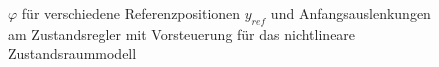 \begin{figure}[H]
    \centering
    \caption[$\varphi$ für Regler mit Vorsteuerung (nichtlinear)]{$\varphi$ für verschiedene Referenzpositionen $y_{ref}$ und Anfangsauslenkungen am Zustandsregler mit Vorsteuerung für das nichtlineare Zustandsraummodell}
    \label{fig:Bild33}
\end{figure}

